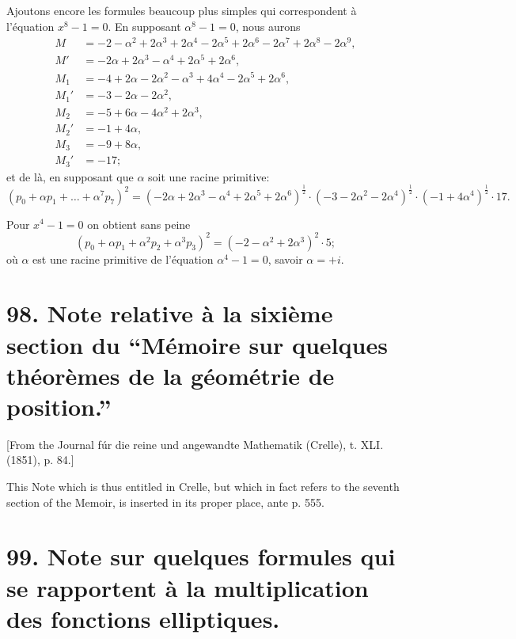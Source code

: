 \documentclass[12pt,a4paper]{article}
\theoremstyle{definition}
\begin{document}
Ajoutons encore les formules beaucoup plus simples qui correspondent \`{a} l'\'{e}quation $x^8 - 1 = 0$. En supposant $\alpha^8 - 1 = 0$, nous aurons
\begin{align*}
M &= -2 - \alpha^2 + 2\alpha^3 + 2\alpha^4 - 2\alpha^5 + 2\alpha^6 - 2\alpha^7 + 2\alpha^8 - 2\alpha^9, \\
M' &= -2\alpha + 2\alpha^3 - \alpha^4 + 2\alpha^5 + 2\alpha^6, \\
M_1 &= -4 + 2\alpha - 2\alpha^2 - \alpha^3 + 4\alpha^4 - 2\alpha^5 + 2\alpha^6, \\
M_1' &= -3 - 2\alpha - 2\alpha^2, \\
M_2 &= -5 + 6\alpha - 4\alpha^2 + 2\alpha^3, \\
M_2' &= -1 + 4\alpha, \\
M_3 &= -9 + 8\alpha, \\
M_3' &= -17;
\end{align*}
et de l\`{a}, en supposant que $\alpha$ soit une racine primitive:
\[
(p_0 + \alpha p_1 + \ldots + \alpha^7 p_7)^2 = (-2\alpha + 2\alpha^3 - \alpha^4 + 2\alpha^5 + 2\alpha^6)^{\frac{1}{2}} \cdot (-3 - 2\alpha^2 - 2\alpha^4)^{\frac{1}{2}} \cdot (-1 + 4\alpha^4)^{\frac{1}{2}} \cdot 17.
\]

Pour $x^4 - 1 = 0$ on obtient sans peine
\[
(p_0 + \alpha p_1 + \alpha^2 p_2 + \alpha^3 p_3)^2 = (-2 - \alpha^2 + 2\alpha^3)^2 \cdot 5;
\]
o\`{u} $\alpha$ est une racine primitive de l'\'{e}quation $\alpha^4 - 1 = 0$, savoir $\alpha = +i$.

\newpage

\section*{98. Note relative \`{a} la sixi\`{e}me section du ``M\'{e}moire sur quelques th\'{e}or\`{e}mes de la g\'{e}om\'{e}trie de position.''}

[From the Journal f\'{u}r die reine und angewandte Mathematik (Crelle), t. XLI. (1851), p. 84.]

This Note which is thus entitled in Crelle, but which in fact refers to the seventh section of the Memoir, is inserted in its proper place, ante p. 555.

\newpage

\section*{99. Note sur quelques formules qui se rapportent \`{a} la multiplication des fonctions elliptiques.}
\end{document}
